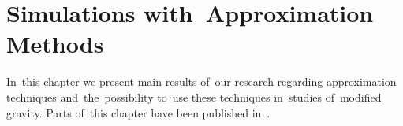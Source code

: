 \chapter{Simulations with~Approximation Methods}
\label{chpt:app_sims}
In~this chapter we present main results of~our research regarding approximation techniques and~the~possibility to~use these techniques in~studies of~modified gravity. Parts of~this chapter have been published in~\textcite{2020MNRAS.493.2085V}.


